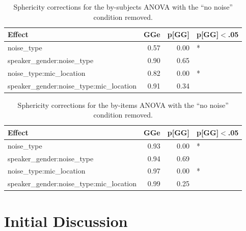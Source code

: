 \documentclass[dissertation,copyright]{uathesis}
\begin{document}
\begin{table}[ht]
\centering
\begin{tabular}{lrrl}
  \hline
Effect & GGe & p[GG] & p[GG]$<$.05 \\ 
  \hline
noise\_type & 0.57 & 0.00 & * \\ 
  speaker\_gender:noise\_type & 0.90 & 0.65 &  \\ 
  noise\_type:mic\_location & 0.82 & 0.00 & * \\ 
  speaker\_gender:noise\_type:mic\_location & 0.91 & 0.34 &  \\ 
   \hline
\end{tabular}
\caption{Sphericity corrections for the by-subjects ANOVA with the ``no noise'' condition removed.} 
\label{tab:anova2_subj_sph_corr}
\end{table}
\begin{table}[ht]
\centering
\begin{tabular}{lrrl}
  \hline
Effect & GGe & p[GG] & p[GG]$<$.05 \\ 
  \hline
noise\_type & 0.93 & 0.00 & * \\ 
  speaker\_gender:noise\_type & 0.94 & 0.69 &  \\ 
  noise\_type:mic\_location & 0.97 & 0.00 & * \\ 
  speaker\_gender:noise\_type:mic\_location & 0.99 & 0.25 &  \\ 
   \hline
\end{tabular}
\caption{Sphericity corrections for the by-items ANOVA with the ``no noise'' condition removed.} 
\label{tab:anova2_item_sph_corr}
\end{table}





\section{Initial Discussion}
\end{document}
